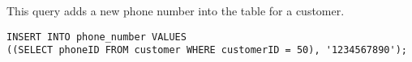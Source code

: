 This query adds a new phone number into the table for a customer.

\begin{lstlisting}
INSERT INTO phone_number VALUES
((SELECT phoneID FROM customer WHERE customerID = 50), '1234567890');
\end{lstlisting}